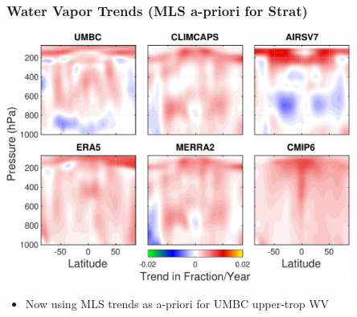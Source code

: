 \documentclass[10pt,t]{beamer}
\begin{document}
\begin{frame}
\frametitle{Water Vapor Trends (MLS a-priori for Strat)}  
\vspace{-0.15in}
\begin{center}
\includegraphics[width=0.85\textwidth]{./Figslls/tiled_all_N_WV_trend_with_mls_start_with_cmip6.pdf}
\end{center}

\small
\begin{itemize}
\item Now using MLS trends as a-priori for UMBC upper-trop WV
\end{itemize}
\end{frame}
\end{document}

